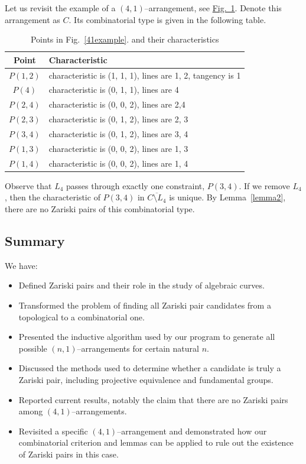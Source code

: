\documentclass{svproc}
\begin{document}
Let us revisit the example of a $(4,1)$--arrangement, see  \hyperlink{41example}{Fig.~1}. Denote this arrangement as $C$. Its combinatorial type is given in the following table.
\FloatBarrier
\begin{table}[h!]
\centering
\begin{tabular}{|c|l|}
\hline
\textbf{Point} & \textbf{Characteristic} \\ \hline
$P(1,2)$ & characteristic is (1, 1, 1), lines are 1, 2, tangency is 1 \\ \hline
$P(4)$ & characteristic is (0, 1, 1), lines are 4\\ \hline
$P(2,4)$ & characteristic is (0, 0, 2), lines are 2,4 \\ \hline
$P(2,3)$ &characteristic is (0, 1, 2), lines are 2, 3 \\ \hline
$P(3,4)$ & characteristic is (0, 1, 2), lines are 3, 4\\ \hline
$P(1,3)$ &characteristic is (0, 0, 2), lines are 1, 3 \\ \hline
$P(1,4)$ & characteristic is (0, 0, 2), lines are 1, 4\\ \hline
\end{tabular}
\caption{Points in Fig.~\ref{41example}. and their characteristics}
\end{table}
\FloatBarrier
Observe that $L_4$ passes through exactly one constraint, $P(3,4)$. If we remove $L_4$, then the characteristic of $P(3,4)$ in $\overline{C \setminus L_4} $ is unique. By Lemma~\ref{lemma2}, there are no Zariski pairs of this combinatorial type.


\subsection{Summary}

We have:
\begin{itemize}
    \item Defined Zariski pairs and their role in the study of algebraic curves.
    \item Transformed the problem of finding all Zariski pair candidates from a topological to a combinatorial one.
    \item Presented the inductive algorithm used by our program to generate all possible $(n,1)$--arrangements for certain natural $n$.
    \item Discussed the methods used to determine whether a candidate is truly a Zariski pair, including projective equivalence and fundamental groups.
    \item Reported current results, notably the claim that there are no Zariski pairs among $(4,1)$--arrangements.
    \item Revisited a specific $(4,1)$--arrangement and demonstrated how our combinatorial criterion and lemmas can be applied to rule out the existence of Zariski pairs in this case.


\end{itemize}
\end{document}
